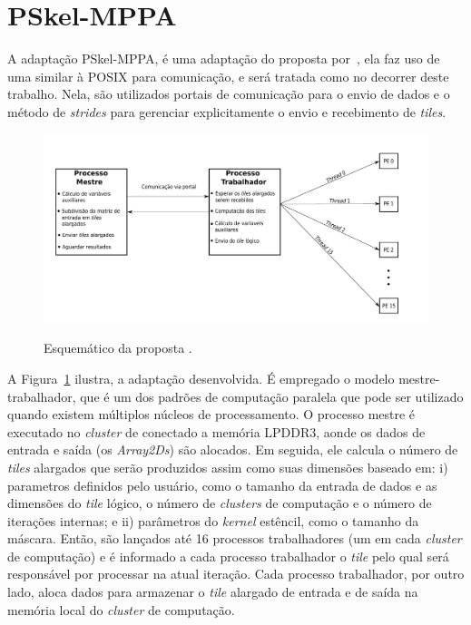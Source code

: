 \section{PSkel-MPPA}
\label{sec:pskel-mppa}

A adaptação PSkel-MPPA, é uma adaptação do \pskel proposta por~\cite{wscad2017}, ela faz uso de uma \api similar à POSIX \ipc para comunicação, e será tratada como \ipc no decorrer deste trabalho. Nela, são utilizados portais de comunicação para o envio de dados e o método de \textit{strides}  para gerenciar explicitamente o envio e recebimento de \textit{tiles}.

\begin{figure}
    \centering
    \caption{Esquemático da proposta \pskelmppa.}
    \includegraphics[width=1\textwidth]{figs/visaoGeralPSKELMPPATrabalhador.pdf} \\
    \label{fig:visaoGeralPSkelMPPA}
\end{figure}


A Figura~\ref{fig:visaoGeralPSkelMPPA} ilustra, a adaptação
desenvolvida. É empregado o modelo mestre-trabalhador, que é um dos padrões de computação paralela que pode ser utilizado quando existem múltiplos núcleos de processamento. O processo mestre é executado no \emph{cluster} de \io conectado a memória LPDDR3, aonde os dados de entrada e saída (os \emph{Array2Ds}) são alocados. Em seguida, ele calcula o número de \emph{tiles} alargados que serão produzidos assim como suas dimensões baseado em: i) parametros definidos pelo usuário, como o tamanho da entrada de dados e as dimensões do \emph{tile} lógico, o número de \emph{clusters} de computação e o número de iterações internas; e ii) parâmetros do \emph{kernel} estêncil, como o tamanho da máscara. Então, são lançados até 16 processos trabalhadores (um em cada \emph{cluster} de computação) e é informado a cada processo trabalhador o \emph{tile} pelo qual será responsável por processar na atual iteração. Cada processo trabalhador, por outro lado, aloca dados para armazenar o \emph{tile} alargado de entrada e de saída na memória local do \emph{cluster} de computação.

